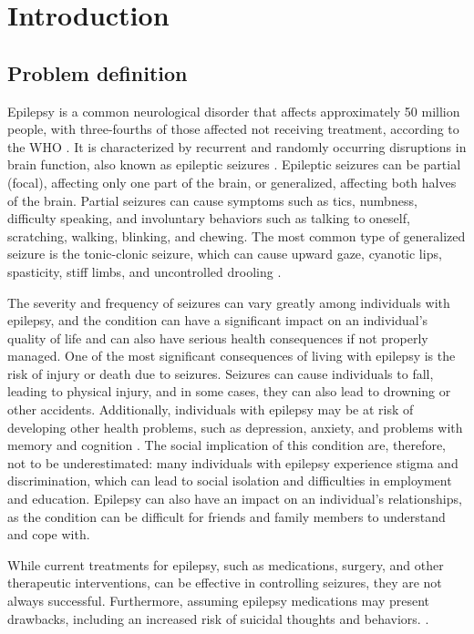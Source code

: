 \chapter{Introduction}
\section{Problem definition}
Epilepsy is a common neurological disorder that affects approximately 50 million people, with three-fourths of those affected not receiving treatment, according to the \gls{WHO} \cite{world_health_organization_epilepsy_2022}. It is characterized by recurrent and randomly occurring disruptions in brain function, also known as epileptic seizures \cite{fisher_ilae_2014, stafstrom_seizures_2015}.
Epileptic seizures can be partial (focal), affecting only one part of the brain, or generalized, affecting both halves of the brain. Partial seizures can cause symptoms such as tics, numbness, difficulty speaking, and involuntary behaviors such as talking to oneself, scratching, walking, blinking, and chewing. The most common type of generalized seizure is the tonic-clonic seizure, which can cause upward gaze, cyanotic lips, spasticity, stiff limbs, and uncontrolled drooling \cite{sirven_epilepsy_2015, arai_intelligent_2020}.

The severity and frequency of seizures can vary greatly among individuals with epilepsy, and the condition can have a significant impact on an individual's quality of life and can also have serious health consequences if not properly managed.
One of the most significant consequences of living with epilepsy is the risk of injury or death due to seizures. Seizures can cause individuals to fall, leading to physical injury, and in some cases, they can also lead to drowning or other accidents. Additionally, individuals with epilepsy may be at risk of developing other health problems, such as depression, anxiety, and problems with memory and cognition \cite{fiest_depression_2013}.
The social implication of this condition are, therefore, not to be underestimated: many individuals with epilepsy experience stigma and discrimination, which can lead to social isolation and difficulties in employment and education. Epilepsy can also have an impact on an individual's relationships, as the condition can be difficult for friends and family members to understand and cope with.

While current treatments for epilepsy, such as medications, surgery, and other therapeutic interventions, can be effective in controlling seizures, they are not always successful. Furthermore, assuming epilepsy medications may present drawbacks, including an increased risk of suicidal thoughts and behaviors. \cite{joseph_i_sirven_md_staying_2013}.

